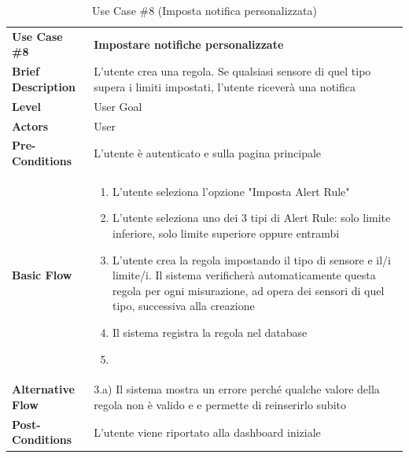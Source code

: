 \documentclass[a4paper, 11pt]{article}
\begin{document}
	\begin{table}[h]
		\centering
		\setlength{\arrayrulewidth}{0.8pt} %

		\begin{tabular}{|l p{12cm}|}
			\hline

			\rowcolor{gray!25}
			\textbf{Use Case \#8} & \textbf{Impostare notifiche personalizzate} \\
			\textbf{Brief Description} &  L'utente crea una regola. Se qualsiasi sensore di quel tipo supera i limiti impostati, l'utente riceverà una notifica \\
			\textbf{Level} & User Goal \\
			\textbf{Actors} & User \\
			\textbf{Pre-Conditions} & L'utente è autenticato e sulla pagina principale \\
			\textbf{Basic Flow} & \begin{enumerate}[label=\arabic*), leftmargin=*, before=\vspace{-0.7cm}, after=\vspace{-0.4cm}]
									  \item L'utente seleziona l'opzione "Imposta Alert Rule"
									  \item L'utente seleziona uno dei 3 tipi di Alert Rule: solo limite inferiore, solo limite superiore oppure entrambi
									  \item L'utente crea la regola impostando il tipo di sensore e il/i limite/i. Il sistema verificherà automaticamente questa regola per ogni misurazione, ad opera dei sensori di quel tipo, successiva alla creazione
									  \item Il sistema registra la regola nel database
									  \item[]
			\end{enumerate} \\
			\textbf{Alternative Flow} & 3.a) Il sistema mostra un errore perché qualche valore della regola non è valido e e permette di reinserirlo subito\\
			\textbf{Post-Conditions} & L'utente viene riportato alla dashboard iniziale \\

			\hline
		\end{tabular}

		\vspace{0.2cm}
		\caption{Use Case \#8 (Imposta notifica personalizzata)}
	\end{table}
	\vspace{1cm}
\end{document}
